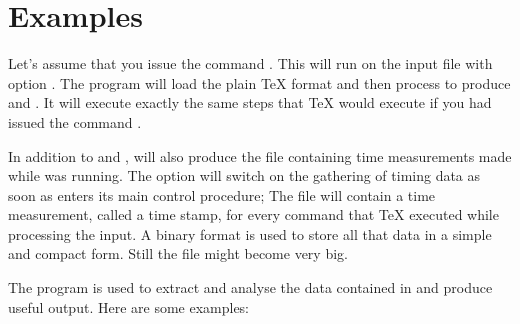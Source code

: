 \documentclass[a4paper,english]{article}
\begin{document}
\section{Examples}
  Let's assume that you issue the command   .
  This will run  on the input file  with option .
  The program  will load the plain TeX format and then
  process  to produce  and .
  It will execute  exactly the same steps that TeX would execute if you had
  issued the command  .

  In addition to  and ,  will
  also produce the file  containing time measurements
  made while   was running. 
  The option  will switch on the gathering of
  timing data as soon as  enters its main control procedure;
  The file  will contain a time measurement, called a time
  stamp, for every command that TeX executed while processing the input.
  A binary format is used to store all that data in a simple and compact
  form. Still the file  might become very big.

  The program  is used to extract and analyse the
  data contained in  and produce useful output.
  Here are some examples:
  
\end{document}
